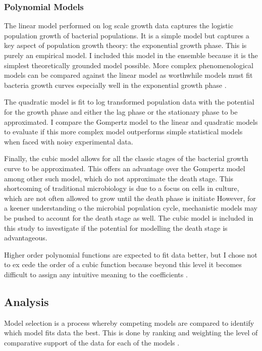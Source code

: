 \documentclass[11pt]{article}
\begin{document}
  \subsubsection{Polynomial Models}
  The linear model performed on log scale growth data captures the logistic population growth of bacterial populations. It is a simple model but captures a key aspect of population growth theory: the exponential growth phase. This is purely an empirical model. I included this model in the ensemble because it is the simplest theoretically grounded model possible. More complex phenomenological models can be compared against the linear model as worthwhile models  must fit bacteria growth curves especially well in the exponential growth phase \citep{Allen2018}. 

  The quadratic model is fit to log transformed population data with the potential for the growth phase and either the lag phase or the stationary phase to be approximated. I compare the Gompertz model to the linear and quadratic models to evaluate if this more complex model outperforms simple statistical models when faced with noisy experimental data.

  Finally, the cubic model allows for all the classic stages of the bacterial growth curve to be approximated. This offers an advantage over the Gompertz model among other such model, which do not approximate the death stage. This shortcoming of traditional microbiology is due to a focus on cells in culture, which are not often allowed to grow until the death phase is initiate However, for a keener understanding o the microbial population cycle, mechanistic models may be pushed to account for the death stage as well. The cubic model is included in this study to investigate if the potential for modelling the death stage is advantageous.

  Higher order polynomial functions are expected to fit data better, but I chose not to ex cede the order of a cubic function because beyond this level it becomes difficult to assign any intuitive meaning to the coefficients \citep{Allen2018}. 

  
  
  \subsection{Analysis}
  Model selection is a process whereby competing models are compared to identify which model fits data the best. This is done by ranking and weighting the level of comparative support of the data for each of the models \citep{Johnson2004}. 
\end{document}
